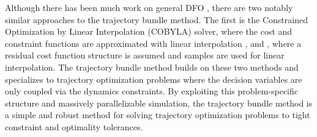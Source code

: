 Although there has been much work on general DFO \cite{conn1997, kochenderfer2019,conn2009}, there are two notably similar approaches to the trajectory bundle method. The first is the Constrained Optimization by Linear Interpolation (COBYLA) solver, where the cost and constraint functions are approximated with linear interpolation \cite{powell1994}, and \cite{cartis2019}, where a residual cost function structure is assumed and samples are used for linear interpolation. The trajectory bundle method builds on these two methods and specializes to trajectory optimization problems where the decision variables are only coupled via the dynamics constraints. By exploiting this problem-specific structure and massively parallelizable simulation, the trajectory bundle method is a simple and robust method for solving trajectory optimization problems to tight constraint and optimality tolerances.
%
%
%
%
